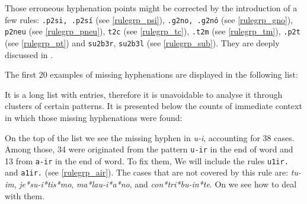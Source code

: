 Those erroneous hyphenation points might be corrected by the introduction of a few rules:
\texttt{.p2si, .p2sí} (see \cref{rulegrp_psi}), \texttt{.g2no, .g2nó} (see \cref{rulegrp_gno}), 
\texttt{p2neu} (see \cref{rulegrp_pneu}),
\texttt{t2c} (see \cref{rulegrp_tc}), \texttt{.t2m} (see \cref{rulegrp_tm}), \texttt{.p2t} (see \cref{rulegrp_pt}) 
and \texttt{su2b3r}, \texttt{su2b3l}  (see \cref{rulegrp_sub}). They are deeply 
discussed in .


The first 20 examples of missing hyphenations are displayed in the following list:
It is a long list with \NumberOfMissingSix{} entries, therefore it is
unavoidable to analyse it through clusters of certain patterns. It is presented
below the counts of immediate context in which those missing hyphenations were
found:





On the top of the list we see the missing hyphen in \emph{u-i}, accounting for
38 cases. Among those, 34 were originated from the pattern \texttt{u-ir} in the
end of word and 13 from \texttt{a-ir} in the end of word. 
To fix them, We will include the rules \texttt{u1ir.} and \texttt{a1ir.} (see 
\cref{rulegrp_air}). The cases that are not covered by this rule are:
\emph{tu-im}, \emph{je*su-i*tis*mo}, \emph{ma*lau-i*a*no}, and
\emph{con*tri*bu-in*te}. On  we see how to deal with
them.

